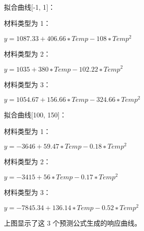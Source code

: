 \documentclass[11pt]{ctexart}
\begin{document}
    \begin{center}
    \end{center}
    { \hspace*{\fill} \\}
    
    拟合曲线{[}-1, 1{]}： 
    
    材料类型为 1：
     
    \(y = 1087.33 + 406.66 ∗ Temp - 108∗ Temp^2 \)
    
    材料类型为 2： 
    
    \(y = 1035 + 380 ∗ Temp - 102.22 ∗Temp^2 \)
    
    材料类型为 3： 
    
    \(y = 1054.67 + 156.66 ∗ Temp - 324.66 ∗Temp^2 \)
    

   拟合曲线{[}100, 150{]}： 
   
   材料类型为 1：
   
    \(y = -3646 + 59.47 ∗ Temp - 0.18 ∗ Temp^2 \)
    
   材料类型为 2： 
   
    \(y = -3415 + 56 ∗ Temp - 0.17 ∗Temp^2 \)
    
   材料类型为 3：
   
    \(y = -7845.34 + 136.14 ∗ Temp - 0.52 ∗Temp^2 \)
    
   上图显示了这 3 个预测公式生成的响应曲线。


    
    
    
\end{document}
